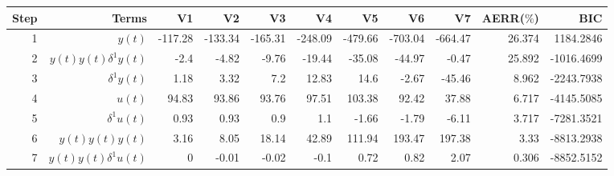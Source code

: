 \begin{tabular}{rrrrrrrrrrr}
Step & Terms & V1 & V2 & V3 & V4 & V5 & V6 & V7 & AERR($\%$) & BIC \\ 
\hline 
1 & $y(t)$ & -117.28 & -133.34 & -165.31 & -248.09 & -479.66 & -703.04 & -664.47 & 26.374 & 1184.2846 \\ 
2 & $y(t)y(t)\delta^1 y(t)$ & -2.4 & -4.82 & -9.76 & -19.44 & -35.08 & -44.97 & -0.47 & 25.892 & -1016.4699 \\ 
3 & $\delta^1 y(t)$ & 1.18 & 3.32 & 7.2 & 12.83 & 14.6 & -2.67 & -45.46 & 8.962 & -2243.7938 \\ 
4 & $u(t)$ & 94.83 & 93.86 & 93.76 & 97.51 & 103.38 & 92.42 & 37.88 & 6.717 & -4145.5085 \\ 
5 & $\delta^1 u(t)$ & 0.93 & 0.93 & 0.9 & 1.1 & -1.66 & -1.79 & -6.11 & 3.717 & -7281.3521 \\ 
6 & $y(t)y(t)y(t)$ & 3.16 & 8.05 & 18.14 & 42.89 & 111.94 & 193.47 & 197.38 & 3.33 & -8813.2938 \\ 
7 & $y(t)y(t)\delta^1 u(t)$ & 0 & -0.01 & -0.02 & -0.1 & 0.72 & 0.82 & 2.07 & 0.306 & -8852.5152 \\ 
\hline 
\end{tabular}